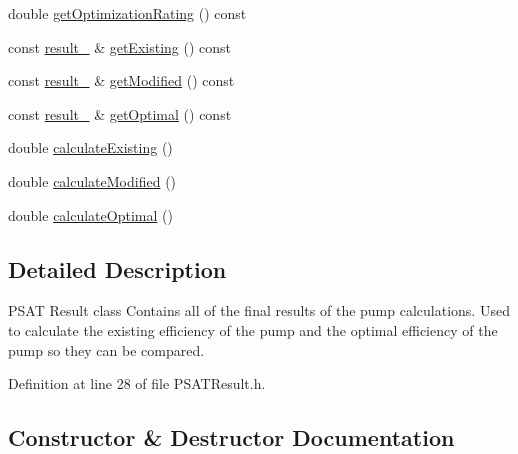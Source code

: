\begin{DoxyCompactItemize}
double \hyperlink{class_p_s_a_t_result_aa0a7001461408fcb06a6c22ce2d064db}{get\+Optimization\+Rating} () const
\item 
const \hyperlink{struct_p_s_a_t_result_1_1result__}{result\+\_\+} \& \hyperlink{class_p_s_a_t_result_a4da660959f368bdf0951728c9c5f931b}{get\+Existing} () const
\item 
const \hyperlink{struct_p_s_a_t_result_1_1result__}{result\+\_\+} \& \hyperlink{class_p_s_a_t_result_ae43bb3b001e2746292d0dd0d6cebcfdd}{get\+Modified} () const
\item 
const \hyperlink{struct_p_s_a_t_result_1_1result__}{result\+\_\+} \& \hyperlink{class_p_s_a_t_result_af587235430371a05799c60e81aa8dfad}{get\+Optimal} () const
\item 
double \hyperlink{class_p_s_a_t_result_a594e019e535fb402d6d0441d50f8b697}{calculate\+Existing} ()
\item 
double \hyperlink{class_p_s_a_t_result_afbb68257a28c1b853d26faf3227461cc}{calculate\+Modified} ()
\item 
double \hyperlink{class_p_s_a_t_result_a25d50cd89b326f18449496a56d54f472}{calculate\+Optimal} ()
\end{DoxyCompactItemize}


\subsection{Detailed Description}
P\+S\+AT Result class Contains all of the final results of the pump calculations. Used to calculate the existing efficiency of the pump and the optimal efficiency of the pump so they can be compared. 

Definition at line 28 of file P\+S\+A\+T\+Result.\+h.



\subsection{Constructor \& Destructor Documentation}
\mbox{\label{class_p_s_a_t_result_af6f9d5dbd3a6aac3d7e5e212e3a40487}} 
